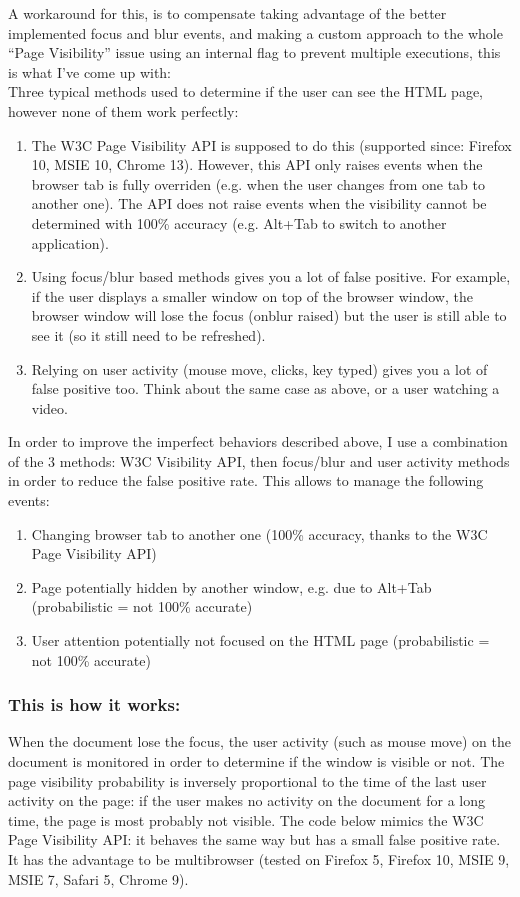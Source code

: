 \documentclass[12pt]{report}
\begin{document}
A workaround for this, is to compensate taking advantage of the better implemented focus and blur events, and making a custom approach to the whole “Page Visibility” issue using an internal flag to prevent multiple executions, this is what I’ve come up with:\\

Three typical methods used to determine if the user can see the HTML page, however none of them work perfectly:
\begin{enumerate}
\item The W3C Page Visibility API is supposed to do this (supported since: Firefox 10, MSIE 10, Chrome 13). However, this API only raises events when the browser tab is fully overriden (e.g. when the user changes from one tab to another one). The API does not raise events when the visibility cannot be determined with 100\% accuracy (e.g. Alt+Tab to switch to another application).
\item Using focus/blur based methods gives you a lot of false positive. For example, if the user displays a smaller window on top of the browser window, the browser window will lose the focus (onblur raised) but the user is still able to see it (so it still need to be refreshed). 
\item Relying on user activity (mouse move, clicks, key typed) gives you a lot of false positive too. Think about the same case as above, or a user watching a video.
\end{enumerate}
In order to improve the imperfect behaviors described above, I use a combination of the 3 methods: W3C Visibility API, then focus/blur and user activity methods in order to reduce the false positive rate. This allows to manage the following events:
\begin{enumerate}
\item Changing browser tab to another one (100\% accuracy, thanks to the W3C Page Visibility API)
\item Page potentially hidden by another window, e.g. due to Alt+Tab (probabilistic = not 100\% accurate)
\item User attention potentially not focused on the HTML page (probabilistic = not 100\% accurate)
\end {enumerate}
\subsubsection{This is how it works:}
 When the document lose the focus, the user activity (such as mouse move) on the document is monitored in order to determine if the window is visible or not. The page visibility probability is inversely proportional to the time of the last user activity on the page: if the user makes no activity on the document for a long time, the page is most probably not visible. The code below mimics the W3C Page Visibility API: it behaves the same way but has a small false positive rate. It has the advantage to be multibrowser (tested on Firefox 5, Firefox 10, MSIE 9, MSIE 7, Safari 5, Chrome 9).\\
\end{document}
